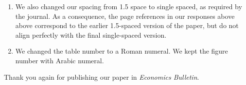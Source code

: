 \documentclass[english,authoryear,12pt]{elsarticle}
\begin{document}
\begin{enumerate}
  \item We also changed our spacing from 1.5 space to single spaced, as required by the journal. As a consequence, the page references in our responses above above correspond to the earlier 1.5-spaced version of the paper, but do not align perfectly with the final single-spaced version.
  \item We changed the table number to a Roman numeral. We kept the figure number with Arabic numeral.
\end{enumerate}

Thank you again for publishing our paper in \textit{Economics Bulletin}.
\end{document}
